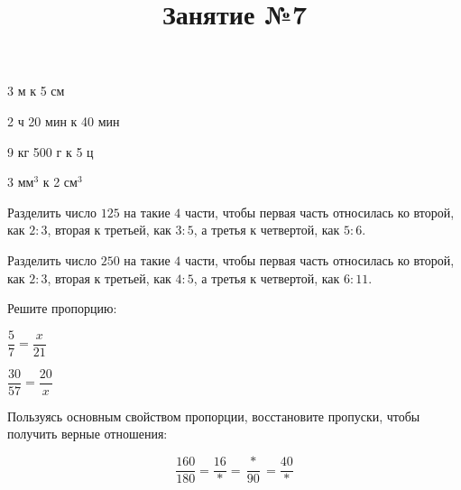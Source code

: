 \begin{listofex}
\begin{enumcols}[itemcolumns=3]
		\item 3 м к 5 см
		\item 2 ч 20 мин к 40 мин
		\item 9 кг 500 г к 5 ц
		\item 3 мм\( ^3 \) к 2 см\( ^3 \)
	\end{enumcols}
	\item Разделить число \( 125 \) на такие \( 4 \) части, чтобы первая часть относилась ко второй, как \( 2:3 \), вторая к третьей, как \( 3:5 \), а третья к четвертой, как \( 5:6 \).
	\item Разделить число \( 250 \) на такие \( 4 \) части, чтобы первая часть относилась ко второй, как \( 2:3 \), вторая к третьей, как \( 4:5 \), а третья к четвертой, как \( 6:11 \).
	\item Решите пропорцию:
	\begin{enumcols}[itemcolumns=2]
		\item \( \dfrac{5}{7}=\dfrac{x}{21} \)
		\item \( \dfrac{30}{57}=\dfrac{20}{x} \)
	\end{enumcols}
	\item Пользуясь основным свойством пропорции, восстановите пропуски, чтобы получить верные отношения:
	
	\[ \dfrac{160}{180}=\dfrac{16}{*}=\dfrac{*}{90}=\dfrac{40}{*} \]
\end{listofex}
%	
\newpage
\title{Занятие №7}
